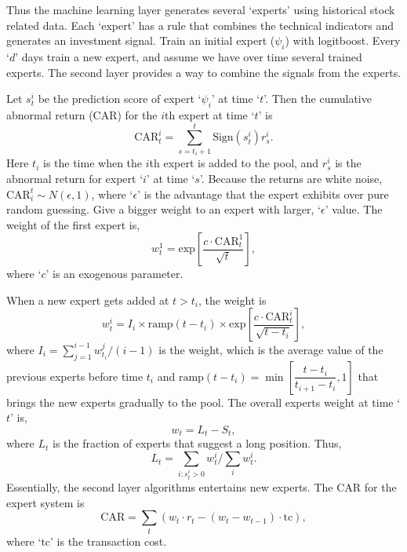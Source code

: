 Thus the machine learning layer generates several `experts' using historical stock related data. Each `expert' has a rule that combines the technical indicators and generates an investment signal. Train an initial expert ($\psi_i$) with logitboost. Every `$d$' days train a new expert, and assume we have over time several trained experts. The second layer provides a way to combine the signals from the experts. 


Let $s_t^i$ be the prediction score of expert `$\psi_i$' at time `$t$'. Then the cumulative abnormal return (CAR) for the $i$th expert at time `$t$' is
	\begin{equation} \label{eqn:carit}
	\text{CAR}_t^i= \sum_{s=t_i+1}^t \text{Sign}(s_t^i) r_s^i.
	\end{equation}
Here $t_i$ is the time when the $i$th expert is added to the pool, and $r_s^i$ is the abnormal return for expert `$i$' at time `$s$'. Because the returns are white noise, $\text{CAR}_i^t \sim N(\epsilon,1)$, where `$\epsilon$' is the advantage that the expert exhibits over pure random guessing. Give a bigger weight to an expert with larger, `$\epsilon$' value. The weight of the first expert is,
	\begin{equation} \label{eqn:weightone}
	w_t^1= \text{exp} \left[ \dfrac{c \cdot \text{CAR}_t^1}{\sqrt{t}} \right],
	\end{equation}
where `$c$' is an exogenous parameter. 


When a new expert gets added at $t>t_i$, the weight is
	\begin{equation} \label{eqn:new_weight}
	w_t^i= I_i \times \text{ramp}(t-t_i) \times \text{exp} \left[ \dfrac{c \cdot \text{CAR}_t^i}{\sqrt{t-t_i}} \right],
	\end{equation}
where $I_i= \sum_{j=1}^{i-1} w_{t_i}^j/(i-1)$ is the weight, which is the average value of the previous experts before time $t_i$ and $\text{ramp}(t-t_i)= \min \left[ \dfrac{t-t_i}{t_{i+1}-t_i}, 1 \right]$ that brings the new experts gradually to the pool. The overall experts weight at time `$t$' is,
	\begin{equation} \label{eqn:overal_expert}
	w_t= L_t - S_t,
	\end{equation}
where $L_t$ is the fraction of experts that suggest a long position. Thus,
	\begin{equation} \label{eqn:weight_l_t}
	L_t = \sum_{i \colon s_t^i>0} w_t^i/ \sum_i w_t^i.
	\end{equation}
Essentially, the second layer algorithms entertains new experts. The CAR for the expert system is 
	\begin{equation} \label{eqn:car_sum}
	\text{CAR}= \sum_t (w_t \cdot r_t - (w_t - w_{t-1}) \cdot \text{tc}),
	\end{equation}
where `$\text{tc}$' is the transaction cost. 


